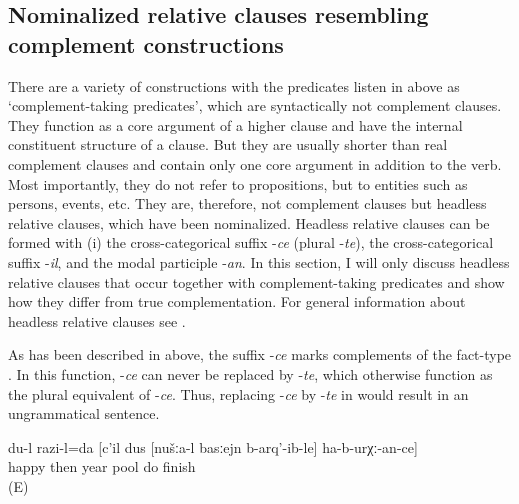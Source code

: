 \subsection{Nominalized relative clauses resembling complement constructions}
\label{ssec:Nominalized relative clauses used with emotion and cognition predicates}
There are a variety of constructions with the predicates listen in  above as `complement-taking predicates', which are syntactically not complement clauses. They function as a core argument of a higher clause and have the internal constituent structure of a clause. But they are usually shorter than real complement clauses and contain only one core argument in addition to the verb. Most importantly, they do not refer to propositions, but to entities such as persons, events, etc. They are, therefore, not complement clauses but headless relative clauses, which have been nominalized. Headless relative clauses can be formed with (i) the cross-categorical suffix -\textit{ce} (plural -\textit{te}), the cross-categorical suffix -\textit{il}, and the modal participle -\textit{an}. In this section, I will only discuss headless relative clauses that occur together with complement-taking predicates and show how they differ from true complementation. For general information about headless relative clauses see .

As has been described in  above, the suffix -\textit{ce} marks complements of the fact-type . In this function, -\textit{ce} can never be replaced by  -\textit{te}, which otherwise function as the plural equivalent of -\textit{ce}. Thus, replacing -\textit{ce} by -\textit{te} in  would result in an ungrammatical sentence.

\begin{exe}
		\ex	\label{‎‎‎I am happy that during the next year we will finish}
	\gll	du-l		razi-l=da		[c'il	dus	[nušːa-l	basːejn	b-arq'-ib-le]		ha-b-urχː-an-ce]\\
			happy	then	year		pool	do	finish \\
	\glt	{} (E)
\end{exe}
	
